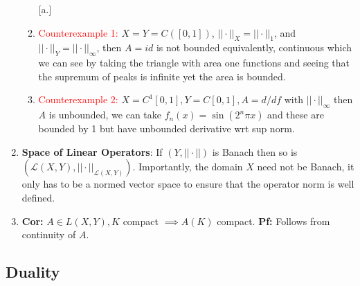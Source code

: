 \documentclass{article}
\begin{document}
\begin{enumerate}
    \begin{enumerate} [a.]
        \item \textcolor{red}{Counterexample 1:} \(X = Y = C([0,1])\), \(||\cdot||_X = ||\cdot||_1\), and \(||\cdot||_Y = ||\cdot||_\infty\), then \(A = id\) is not bounded equivalently, continuous which we can see by taking the triangle with area one functions and seeing that the supremum of peaks is infinite yet the area is bounded.
        \item \textcolor{red}{Counterexample 2:} \(X = C^1[0,1], Y = C[0,1], A = d/df\) with \(||\cdot||_\infty\) then \(A\) is unbounded, we can take \(f_n(x) = \sin(2^n\pi x)\) and these are bounded by 1 but have unbounded derivative wrt sup norm.
    \end{enumerate}

    \item \textbf{Space of Linear Operators}: If \((Y,||\cdot||)\) is Banach then so is \((\mathcal{L}(X, Y), ||\cdot||_{\mathcal{L}(X, Y)})\). Importantly, the domain \(X\) need not be Banach, it only has to be a normed vector space to ensure that the operator norm is well defined.

    \item \textbf{Cor:} \(A\in L(X,Y), K\) compact \( \implies A(K)\) compact. \textbf{Pf:} Follows from continuity of \(A\).
\end{enumerate}

\subsection*{Duality}
\end{document}
